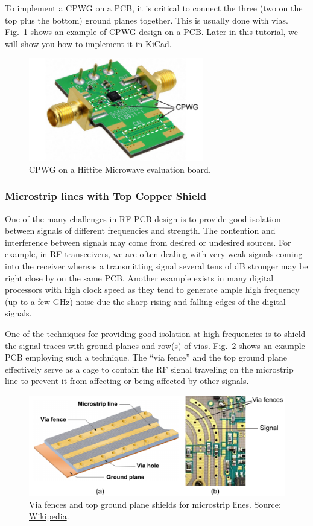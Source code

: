 \documentclass[12pt,letterpaper]{scrartcl}
\begin{document}
To implement a CPWG on a PCB, it is critical to connect the three (two on the top plus the bottom) ground planes together. This is usually done with vias. Fig.~\ref{fig:cpwg-example} shows an example of CPWG design on a PCB. Later in this tutorial, we will show you how to implement it in KiCad. 

	\begin{figure}[hp]
		\centering
		\includegraphics[width=3in]{cpwg-example}
		\caption{CPWG on a Hittite Microwave evaluation board.}
		\label{fig:cpwg-example}
	\end{figure}

\newpage
\subsubsection{Microstrip lines with Top Copper Shield}

One of the many challenges in RF PCB design is to provide good isolation between signals of different frequencies and strength. The contention and interference between signals may come from desired or undesired sources. For example, in RF transceivers, we are often dealing with very weak signals coming into the receiver whereas a transmitting signal several tens of dB stronger may be right close by on the same PCB. Another example exists in many digital processors with high clock speed as they tend to generate ample high frequency (up to a few GHz) noise due the sharp rising and falling edges of the digital signals. 

One of the techniques for providing good isolation at high frequencies is to shield the signal traces with ground planes and row(s) of vias.  Fig.~\ref{fig:via-fence} shows an example PCB employing such a technique. The ``via fence'' and the top ground plane effectively serve as a cage to contain the RF signal traveling on the microstrip line to prevent it from affecting or being affected by other signals. 

	\begin{figure}[hp]
		\centering
		\includegraphics[width=5.5in]{via-fence}
		\caption{Via fences and top ground plane shields for microstrip lines. Source: \href{https://en.wikipedia.org/wiki/Via_fence}{Wikipedia}.}
		\label{fig:via-fence}
	\end{figure}
\end{document}

